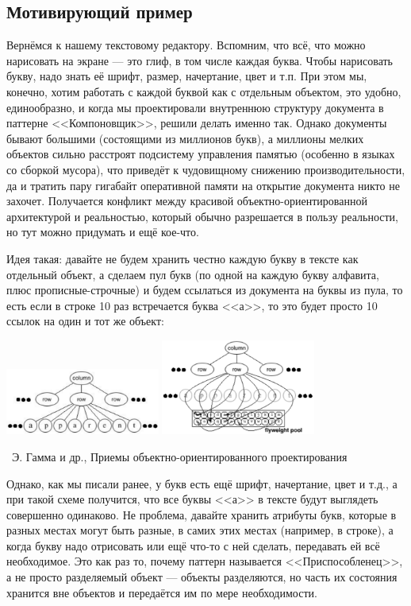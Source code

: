 \documentclass[a5paper]{article}
\newcommand{\attribution}[1] {
    \vspace{-5mm}\begin{flushright}\begin{scriptsize}%
    {\textcopyright\, #1}\end{scriptsize}\end{flushright}
}
\begin{document}
\subsection{Мотивирующий пример}

Вернёмся к нашему текстовому редактору. Вспомним, что всё, что можно нарисовать на экране --- это глиф, в том числе каждая буква. Чтобы нарисовать букву, надо знать её шрифт, размер, начертание, цвет и т.п. При этом мы, конечно, хотим работать с каждой буквой как с отдельным объектом, это удобно, единообразно, и когда мы проектировали внутреннюю структуру документа в паттерне <<Компоновщик>>, решили делать именно так. Однако документы бывают большими (состоящими из миллионов букв), а миллионы мелких объектов сильно расстроят подсистему управления памятью (особенно в языках со сборкой мусора), что приведёт к чудовищному снижению производительности, да и тратить пару гигабайт оперативной памяти на открытие документа никто не захочет. Получается конфликт между красивой объектно-ориентированной архитектурой и реальностью, который обычно разрешается в пользу реальности, но тут можно придумать и ещё кое-что.

Идея такая: давайте не будем хранить честно каждую букву в тексте как отдельный объект, а сделаем пул букв (по одной на каждую букву алфавита, плюс прописные-строчные) и будем ссылаться из документа на буквы из пула, то есть если в строке 10 раз встречается буква <<а>>, то это будет просто 10 ссылок на один и тот же объект:

\begin{center}
    \includegraphics[width=0.38\textwidth]{noFlyweight.png}
    \raisebox{0.1\textheight}{\quad\Huge{$\rightarrow$}\quad}
    \includegraphics[width=0.38\textwidth]{flyweightExample.png}
    \attribution{Э. Гамма и др., Приемы объектно-ориентированного проектирования}
\end{center}

Однако, как мы писали ранее, у букв есть ещё шрифт, начертание, цвет и т.д., а при такой схеме получится, что все буквы <<а>> в тексте будут выглядеть совершенно одинаково. Не проблема, давайте хранить атрибуты букв, которые в разных местах могут быть разные, в самих этих местах (например, в строке), а когда букву надо отрисовать или ещё что-то с ней сделать, передавать ей всё необходимое. Это как раз то, почему паттерн называется <<Приспособленец>>, а не просто разделяемый объект --- объекты разделяются, но часть их состояния хранится вне объектов и передаётся им по мере необходимости.
\end{document}
